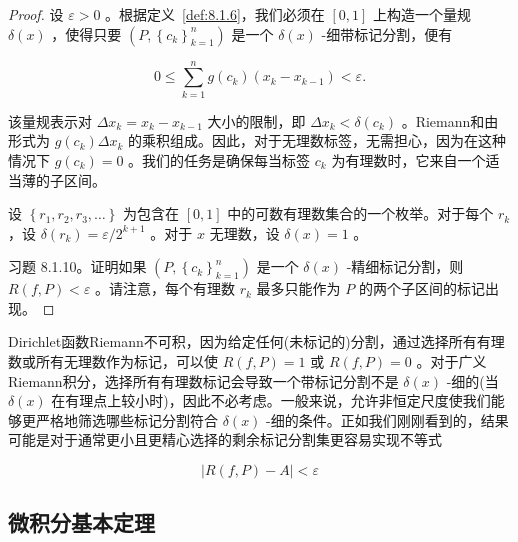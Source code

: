 \begin{proof}
  设 \(\varepsilon  > 0\) 。根据定义~\ref{def:8.1.6}，我们必须在 \(\left\lbrack  {0,1}\right\rbrack\) 上构造一个量规 \(\delta \left( x\right)\) ，使得只要 \(\left( {P,{\left\{  {c}_{k}\right\}  }_{k = 1}^{n}}\right)\) 是一个 \(\delta \left( x\right)\) -细带标记分割，便有

\[
0 \leq  \mathop{\sum }\limits_{{k = 1}}^{n}g\left( {c}_{k}\right) \left( {{x}_{k} - {x}_{k - 1}}\right)  < \varepsilon .
\]

该量规表示对 \(\Delta {x}_{k} = {x}_{k} - {x}_{k - 1}\) 大小的限制，即 \(\Delta {x}_{k} < \delta \left( {c}_{k}\right)\) 。Riemann和由形式为 \(g\left( {c}_{k}\right) \Delta {x}_{k}\) 的乘积组成。因此，对于无理数标签，无需担心，因为在这种情况下 \(g\left( {c}_{k}\right)  = 0\) 。我们的任务是确保每当标签 \({c}_{k}\) 为有理数时，它来自一个适当薄的子区间。

设 \(\left\{  {{r}_{1},{r}_{2},{r}_{3},\ldots }\right\}\) 为包含在 \(\left\lbrack  {0,1}\right\rbrack\) 中的可数有理数集合的一个枚举。对于每个 \({r}_{k}\) ，设 \(\delta \left( {r}_{k}\right)  = \varepsilon /{2}^{k + 1}\) 。对于 \(x\) 无理数，设 \(\delta \left( x\right)  = 1\) 。

习题 8.1.10。证明如果 \(\left( {P,{\left\{  {c}_{k}\right\}  }_{k = 1}^{n}}\right)\) 是一个 \(\delta \left( x\right)\) -精细标记分割，则 \(R\left( {f,P}\right)  < \varepsilon\) 。请注意，每个有理数 \({r}_{k}\) 最多只能作为 \(P\) 的两个子区间的标记出现。
\end{proof}





Dirichlet函数Riemann不可积，因为给定任何(未标记的)分割，通过选择所有有理数或所有无理数作为标记，可以使 \(R\left( {f,P}\right)  = 1\) 或 \(R\left( {f,P}\right)  = 0\) 。对于广义Riemann积分，选择所有有理数标记会导致一个带标记分割不是 \(\delta \left( x\right)\) -细的(当 \(\delta \left( x\right)\) 在有理点上较小时)，因此不必考虑。一般来说，允许非恒定尺度使我们能够更严格地筛选哪些标记分割符合 \(\delta \left( x\right)\) -细的条件。正如我们刚刚看到的，结果可能是对于通常更小且更精心选择的剩余标记分割集更容易实现不等式

\[
\left| {R\left( {f,P}\right)  - A}\right|  < \varepsilon
\]



\subsection{微积分基本定理}

